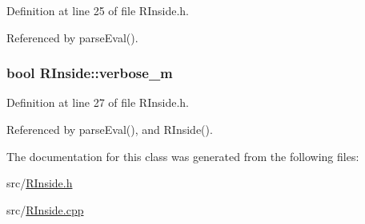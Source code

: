 Definition at line 25 of file RInside.h.

Referenced by parseEval().\hypertarget{classRInside_a186dad3e463fedc586f3d02784a814b2}{
\subsubsection[{verbose\_\-m}]{\setlength{\rightskip}{0pt plus 5cm}bool {\bf RInside::verbose\_\-m}}}
\label{classRInside_a186dad3e463fedc586f3d02784a814b2}


Definition at line 27 of file RInside.h.

Referenced by parseEval(), and RInside().

The documentation for this class was generated from the following files:\begin{DoxyCompactItemize}
\item 
src/\hyperlink{RInside_8h}{RInside.h}\item 
src/\hyperlink{RInside_8cpp}{RInside.cpp}\end{DoxyCompactItemize}

